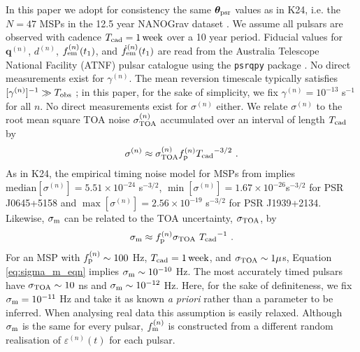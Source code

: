 \documentclass[fleqn,usenatbib,useAMS]{mnras}
\begin{document}
In this paper we adopt for consistency the same $\boldsymbol{\theta}_{\rm psr}$ values as in K24, i.e. the $N=47$ MSPs in the 12.5 year NANOGrav dataset \citep{2020ApJ...905L..34A}. We assume all pulsars are observed with cadence $T_{\rm cad} = 1 \,{\rm week}$ over a 10 year period. Fiducial values for ${\boldsymbol{q}}^{(n)}$, $d^{(n)}$, $f_{\rm em}^{(n)}(t_1)$, and $\dot{f}^{(n)}_{\rm em}(t_1)$ are read from the Australia Telescope National Facility (ATNF) pulsar catalogue \citep{Manchester2005} using the \texttt{psrqpy} package \citep{psrqpy}. No direct measurements exist for $\gamma^{(n)}$. The mean reversion timescale typically satisfies $[\gamma^{(n)}]^{-1} \gg T_{\rm obs}$ \citep{Price2012,Myers2021MNRAS.502.3113M,Meyers2021,Vargas}; in this paper, for the sake of simplicity, we fix $\gamma^{(n)} = 10^{-13}$ s$^{-1}$ for all $n$. No direct measurements exist for $\sigma^{(n)}$ either. We relate $\sigma^{(n)}$ to the root mean square TOA noise $\sigma^{(n)}_{\rm TOA}$ accumulated over an interval of length $T_{\rm cad}$ by
\begin{eqnarray}
	\sigma^{(n)} \approx \sigma_{\rm TOA}^{(n)} f_{\rm p}^{(n)} {T_{\rm cad}}^{-3/2} \ . \label{eq:sigmap_f}
\end{eqnarray}
As in K24, the empirical timing noise model for MSPs from \cite{Shannon2010ApJ...725.1607S} implies $\text{median} [\sigma^{(n)}] = 5.51 \times 10^{-24} $ s$^{-3/2}$, $\min [ \sigma^{(n)} ] = 1.67 \times 10^{-26}$s$^{-3/2}$ for PSR J0645+5158 and $\max [ \sigma^{(n)} ] = 2.56 \times 10^{-19}$ s$^{-3/2}$ for PSR J1939+2134. Likewise, $\sigma_{\rm m}$ can be related to the TOA uncertainty, $\sigma_{\rm TOA}$, by 
\begin{equation}
	\sigma_{\rm m} \approx f_{\rm p}^{(n)} \sigma_{\rm TOA} \ {T_{\rm cad}}^{-1} \ . \label{eq:sigma_m_eqn}
\end{equation}
For an MSP with $f_{\rm p}^{(n)} \sim 100$ Hz, $T_{\rm cad} = 1 \, {\rm week}$, and $\sigma_{\rm TOA} \sim 1 \mu$s,  Equation \eqref{eq:sigma_m_eqn} implies $\sigma_{\rm m} \sim 10^{-10}$ Hz. The most accurately timed pulsars have $\sigma_{\rm TOA} \sim 10 $ ns and $\sigma_{\rm m} \sim 10^{-12}$ Hz. Here, for the sake of definiteness, we fix $\sigma_{\rm m} = 10^{-11}$ Hz and take it as known \textit{a priori} rather than a parameter to be inferred. When analysing real data this assumption is easily relaxed. Although $\sigma_{\rm m}$ is the same for every pulsar, $f_{\rm m} ^{(n)}$ is constructed from a different random realisation of $\varepsilon^{(n)}(t)$ for each pulsar. \newline  
\end{document}
